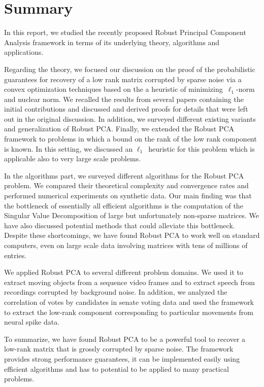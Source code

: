 \section*{Summary}

In this report, we studied the recently proposed Robust Principal Component Analysis framework in terms of its underlying theory, algorithms and applications.

Regarding the theory, we focused our discussion on the proof of the probabilistic guarantees for recovery of a low rank matrix corrupted by sparse noise via a convex optimization techniques based on the a heuristic of minimizing~$\ell_1$-norm and nuclear norm. We recalled the results from several papers containing the initial contributions and discussed and derived proofs for details that were left out in the original discussion. In addition, we surveyed different existing variants and generalization of Robust PCA. Finally, we extended the Robust PCA framework to problems in which a bound on the rank of the low rank component is known. In this setting, we discussed an $\ell_{1}$~heuristic for this  problem which is applicable also to very large scale problems.

In the algorithms part, we surveyed different algorithms for the Robust PCA problem. We compared their theoretical complexity and convergence rates and performed numerical experiments on synthetic data. Our main finding was that the bottleneck of essentially all efficient algorithms is the computation of the Singular Value Decomposition of large but unfortunately non-sparse matrices. We have also discussed potential methods that could alleviate this bottleneck. Despite these shortcomings, we have found Robust PCA to work well on standard computers, even on large scale data involving matrices with tens of millions of entries.

We applied Robust PCA to several different problem domains. We used it to extract moving objects from a sequence video frames and to extract speech from recordings corrupted by background noise. In addition, we analyzed the correlation of votes by candidates in senate voting data and used the framework to extract the low-rank component corresponding to particular movements from neural spike data. 

To summarize, we have found Robust PCA to be a powerful tool to recover a low-rank matrix that is grossly corrupted by sparse noise. The framework provides strong performance guarantees, it can be implemented easily using efficient algorithms and has to potential to be applied to many practical problems. 